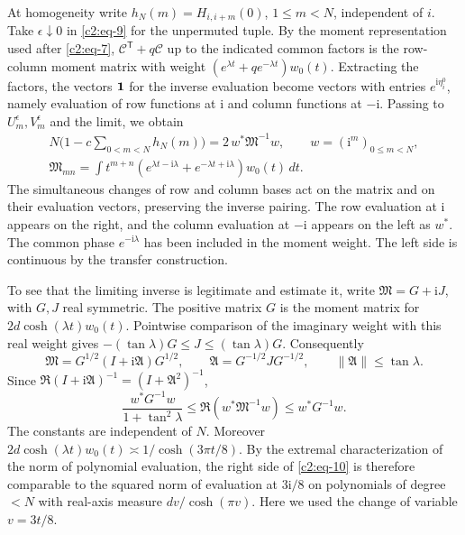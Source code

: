 At homogeneity write \(h_N(m)=H_{i,i+m}(0)\), \(1\le m<N\), independent of \(i\). Take \(\epsilon\downarrow0\) in \eqref{c2:eq-9} for the unpermuted tuple. By the moment representation used after \eqref{c2:eq-7},
\(\mathcal C^\mathsf{T}+q\mathcal C\) up to the indicated common factors is the row-column moment matrix with weight \((e^{\lambda t}+q e^{-\lambda t})w_0(t)\). Extracting the factors, the vectors \({\bf1}\) for the inverse evaluation become vectors with entries \(e^{\mathrm i\eta_i^0}\), namely evaluation of row functions at \(\mathrm i\) and column functions at \(-\mathrm i\). Passing to \(U_m^\epsilon,V_m^\epsilon\) and the limit, we obtain
\begin{equation}
 \begin{gathered}
 N\Big(1-c\sum_{0<m<N}h_N(m)\Big)=2\,w^*\mathfrak M^{-1}w,
 \qquad w=(\mathrm i^m)_{0\le m<N},\\
 \mathfrak M_{mn}=\int t^{m+n}
 (e^{\lambda t-\mathrm i\lambda}+e^{-\lambda t+\mathrm i\lambda})w_0(t)\,dt.
 \end{gathered}\label{c2:eq-10}
\end{equation}
The simultaneous changes of row and column bases act on the matrix
and on their evaluation vectors, preserving the inverse pairing.  The row
evaluation at $\mathrm i$ appears on the right, and the column evaluation
at $-\mathrm i$ appears on the left as $w^*$.  The common phase
$e^{-\mathrm i\lambda}$ has been included in the moment weight.
The left side is continuous by the transfer construction.

To see that the limiting inverse is legitimate and estimate it, write
$\mathfrak M=G+\mathrm iJ$, with $G,J$ real symmetric.  The positive
matrix $G$ is the moment matrix for
$2d\cosh(\lambda t)w_0(t)$.  Pointwise comparison of the imaginary
weight with this real weight gives
$-(\tan\lambda)G\le J\le(\tan\lambda)G$.  Consequently
\[
 \mathfrak M=G^{1/2}(I+\mathrm i\mathfrak A)G^{1/2},\qquad
 \mathfrak A=G^{-1/2}JG^{-1/2},\qquad
 \|\mathfrak A\|\le\tan\lambda.
\]
Since $\Re(I+\mathrm i\mathfrak A)^{-1}=(I+\mathfrak A^2)^{-1}$,
\[
 \frac{w^*G^{-1}w}{1+\tan^2\lambda}
 \le \Re(w^*\mathfrak M^{-1}w)\le w^*G^{-1}w.
\]
The constants are independent of $N$.  Moreover
$2d\cosh(\lambda t)w_0(t)\asymp1/\cosh(3\pi t/8)$.
By the extremal characterization of the norm of polynomial evaluation,
the right side of \eqref{c2:eq-10} is therefore comparable to the squared
norm of evaluation at $3\mathrm i/8$ on polynomials of degree $<N$
with real-axis measure $dv/\cosh(\pi v)$.  Here we used the change of
variable $v=3t/8$.

